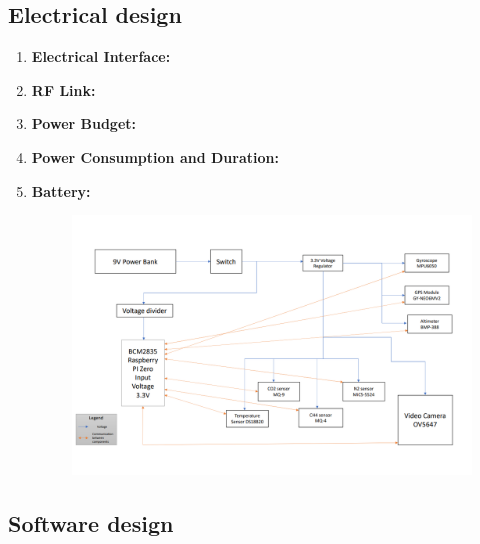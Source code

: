 \documentclass[11pt]{article}
\begin{document}
\subsection{Electrical design}
\begin{enumerate}
\item \textbf{Electrical Interface:}
\item \textbf{RF Link:}
\item \textbf{Power Budget:}
\item \textbf{Power Consumption and Duration:}
\item \textbf{Battery:} 

\begin{figure}[h]
\includegraphics[width=15cm]{Schema_electrica}
\centering
\end{figure}
\end{enumerate}

\subsection{Software design}
\end{document}
